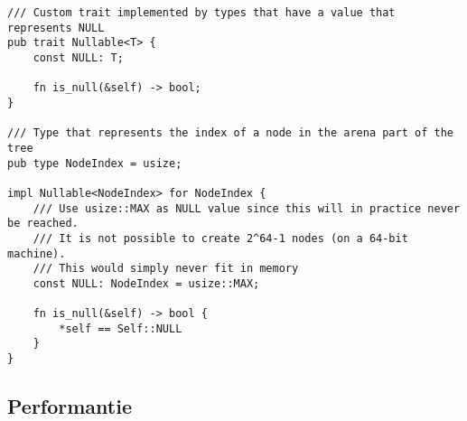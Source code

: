 \begin{verbatim}
/// Custom trait implemented by types that have a value that represents NULL
pub trait Nullable<T> {
    const NULL: T;

    fn is_null(&self) -> bool;
}

/// Type that represents the index of a node in the arena part of the tree
pub type NodeIndex = usize;

impl Nullable<NodeIndex> for NodeIndex {
    /// Use usize::MAX as NULL value since this will in practice never be reached.
    /// It is not possible to create 2^64-1 nodes (on a 64-bit machine).
    /// This would simply never fit in memory
    const NULL: NodeIndex = usize::MAX;

    fn is_null(&self) -> bool {
        *self == Self::NULL
    }
}
\end{verbatim}

\subsection{Performantie}\label{subsec:performantie}


